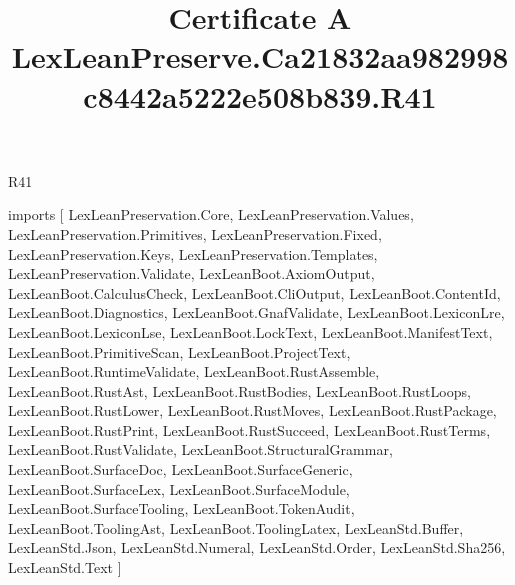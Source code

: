 \begin{lexlean}{R41}
\title{Certificate A LexLeanPreserve.Ca21832aa982998c8442a5222e508b839.R41}
\begin{coremodule}
imports [
  LexLeanPreservation.Core,
  LexLeanPreservation.Values,
  LexLeanPreservation.Primitives,
  LexLeanPreservation.Fixed,
  LexLeanPreservation.Keys,
  LexLeanPreservation.Templates,
  LexLeanPreservation.Validate,
  LexLeanBoot.AxiomOutput,
  LexLeanBoot.CalculusCheck,
  LexLeanBoot.CliOutput,
  LexLeanBoot.ContentId,
  LexLeanBoot.Diagnostics,
  LexLeanBoot.GnafValidate,
  LexLeanBoot.LexiconLre,
  LexLeanBoot.LexiconLse,
  LexLeanBoot.LockText,
  LexLeanBoot.ManifestText,
  LexLeanBoot.PrimitiveScan,
  LexLeanBoot.ProjectText,
  LexLeanBoot.RuntimeValidate,
  LexLeanBoot.RustAssemble,
  LexLeanBoot.RustAst,
  LexLeanBoot.RustBodies,
  LexLeanBoot.RustLoops,
  LexLeanBoot.RustLower,
  LexLeanBoot.RustMoves,
  LexLeanBoot.RustPackage,
  LexLeanBoot.RustPrint,
  LexLeanBoot.RustSucceed,
  LexLeanBoot.RustTerms,
  LexLeanBoot.RustValidate,
  LexLeanBoot.StructuralGrammar,
  LexLeanBoot.SurfaceDoc,
  LexLeanBoot.SurfaceGeneric,
  LexLeanBoot.SurfaceLex,
  LexLeanBoot.SurfaceModule,
  LexLeanBoot.SurfaceTooling,
  LexLeanBoot.TokenAudit,
  LexLeanBoot.ToolingAst,
  LexLeanBoot.ToolingLatex,
  LexLeanStd.Buffer,
  LexLeanStd.Json,
  LexLeanStd.Numeral,
  LexLeanStd.Order,
  LexLeanStd.Sha256,
  LexLeanStd.Text
]


\end{coremodule}
\end{lexlean}
